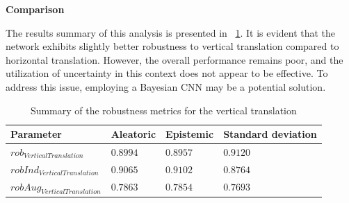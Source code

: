 \vspace{0.3cm}
\textbf{Comparison}
\vspace{0.1cm}

The results summary of this analysis is presented in \Tab~\ref{table:rob_vt}. It is evident that the network exhibits slightly better robustness to vertical translation compared to horizontal translation. However, the overall performance remains poor, and the utilization of uncertainty in this context does not appear to be effective. To address this issue, employing a Bayesian CNN may be a potential solution.

\begin{table}[h]
	\centering
	\begin{tabular}{|| l | l | l | l ||} 
		\hline
		\textbf{Parameter} & \textbf{Aleatoric} & \textbf{Epistemic} & \textbf{Standard deviation} \\
		\hline
		\hline
		$rob_{VerticalTranslation}$ & $0.8994$ & $0.8957$ & $0.9120$ \\
		$robInd_{VerticalTranslation}$ & $0.9065$ & $0.9102$ & $0.8764$ \\
		$robAug_{VerticalTranslation}$ & $0.7863$ & $0.7854$ & $0.7693$ \\	
		\hline
	\end{tabular}	
	\caption{Summary of the robustness metrics for the vertical translation}
	\label{table:rob_vt}
\end{table}